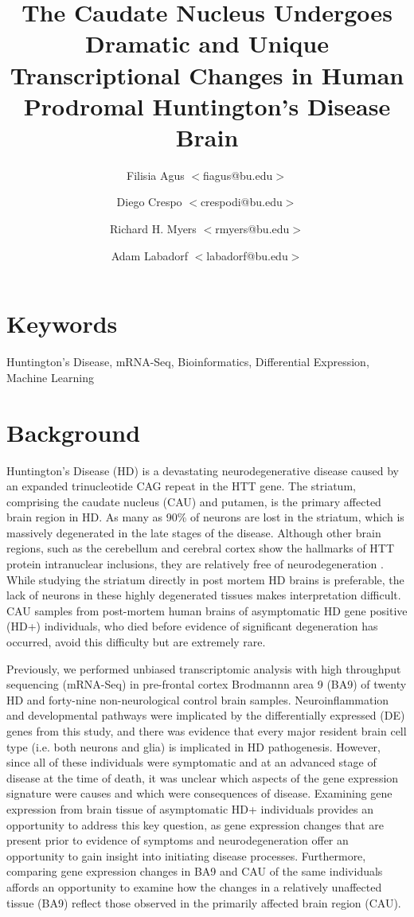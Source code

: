 \documentclass[fleqn,10pt,table]{wlscirep}
\author[1,2,3]{Filisia Agus $<$fiagus@bu.edu$>$}
\author[1,2]{Diego Crespo $<$crespodi@bu.edu$>$}
\author[3]{Richard H. Myers $<$rmyers@bu.edu$>$}
\author[1,3,*]{Adam Labadorf $<$labadorf@bu.edu$>$}
\affil[1]{Bioinformatics Hub, Boston University, Boston, 02118, USA}
\affil[2]{Bioinformatics Program, Boston University, Boston, 02118, USA}
\affil[3]{Department of Neurology, Boston University School of Medicine, Boston, 02118, USA}
\affil[*]{labadorf@bu.edu}
\title{The Caudate Nucleus Undergoes Dramatic and Unique Transcriptional Changes in Human Prodromal Huntington's Disease Brain}
\begin{document}
\flushbottom
\maketitle

\thispagestyle{empty}

\section{Keywords}
Huntington's Disease, mRNA-Seq, Bioinformatics, Differential Expression, Machine Learning

\section{Background}
Huntington’s Disease (HD) is a devastating neurodegenerative disease caused by an expanded trinucleotide CAG repeat in the HTT gene.
The striatum, comprising the caudate nucleus (CAU) and putamen, is the primary affected brain region in HD.
As many as 90\% of neurons are lost in the striatum, which is massively degenerated in the late stages of the disease.
Although other brain regions, such as the cerebellum and cerebral cortex show the hallmarks of HTT protein intranuclear inclusions, they are relatively free of neurodegeneration \cite{Sotrel1991-bv,Vonsattel1985-ak}.
While studying the striatum directly in post mortem HD brains is preferable, the lack of neurons in these highly degenerated tissues makes interpretation difficult.
CAU samples from post-mortem human brains of asymptomatic HD gene positive (HD+) individuals, who died before evidence of significant degeneration has occurred, avoid this difficulty but are extremely rare.

Previously, we performed unbiased transcriptomic analysis with high throughput sequencing (mRNA-Seq) in pre-frontal cortex Brodmannn area 9 (BA9) of twenty HD and forty-nine non-neurological control brain samples\cite{Labadorf2015-zf}.
Neuroinflammation and developmental pathways were implicated by the differentially expressed (DE) genes from this study, and there was evidence that every major resident brain cell type (i.e. both neurons and glia) is implicated in HD pathogenesis.
However, since all of these individuals were symptomatic and at an advanced stage of disease at the time of death, it was unclear which aspects of the gene expression signature were causes and which were consequences of disease.
Examining gene expression from brain tissue of asymptomatic HD+ individuals provides an opportunity to address this key question, as gene expression changes that are present prior to evidence of symptoms and neurodegeneration offer an opportunity to gain insight into initiating disease processes.
Furthermore, comparing gene expression changes in BA9 and CAU of the same individuals affords an opportunity to examine how the changes in a relatively unaffected tissue (BA9) reflect those observed in the primarily affected brain region (CAU).
\end{document}
